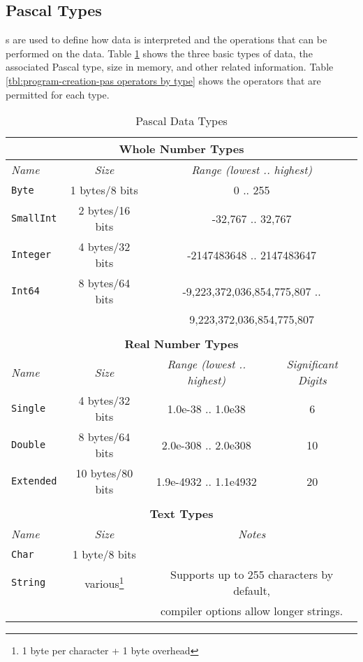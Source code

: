 \clearpage
\subsection{Pascal Types} %
\label{sub:program-creation-pas_types}

s are used to define how data is interpreted and the operations that can be performed on the data. Table \ref{tbl:program-creation-pas-types} shows the three basic types of data, the associated Pascal type, size in memory, and other related information. Table \ref{tbl:program-creation-pas operators by type} shows the operators that are permitted for each type.

\begin{table}[h] 
\begin{minipage}{\textwidth}
\centering
\begin{tabular}{|l|c|c|c|}
\hline
\multicolumn{4}{|c|}{\textbf{Whole Number Types}} \\
\hline
\emph{Name} & \emph{Size} & \multicolumn{2}{c|}{\emph{Range (lowest .. highest)}} \\
\hline
\texttt{Byte} & 1 bytes/8 bits & \multicolumn{2}{c|}{0 .. 255} \\
\texttt{SmallInt} & 2 bytes/16 bits & \multicolumn{2}{c|}{-32,767 .. 32,767} \\
\texttt{Integer} & 4 bytes/32 bits & \multicolumn{2}{c|}{-2147483648 .. 2147483647} \\
\texttt{Int64}    & 8 bytes/64 bits & \multicolumn{2}{c|}{-9,223,372,036,854,775,807 ..} \\
  & & \multicolumn{2}{c|}{9,223,372,036,854,775,807} \\
\hline
\multicolumn{4}{c}{} \\
\hline
\multicolumn{4}{|c|}{\textbf{Real Number Types}} \\
\hline
\emph{Name} & \emph{Size} & \emph{Range (lowest .. highest)} & \emph{Significant Digits} \\
\hline
\texttt{Single} & 4 bytes/32 bits & 1.0e-38 .. 1.0e38 & 6 \\
\texttt{Double} & 8 bytes/64 bits & 2.0e-308 .. 2.0e308 & 10 \\
\texttt{Extended} & 10 bytes/80 bits & 1.9e-4932 .. 1.1e4932 & 20 \\
\hline
\multicolumn{4}{c}{} \\
\hline
\multicolumn{4}{|c|}{\textbf{Text Types}} \\
\hline
\emph{Name} & \emph{Size} & \multicolumn{2}{c|}{\emph{Notes}} \\
\hline
\texttt{Char}  & 1 byte/8 bits & \multicolumn{2}{c|}{} \\
\hline
\texttt{String} & various\footnote{1 byte per character + 1 byte overhead} &  \multicolumn{2}{c|}{Supports up to 255 characters by default,} \\
 & & \multicolumn{2}{c|}{compiler options allow longer strings.} \\
\hline
\end{tabular}
\caption{Pascal Data Types}\label{tbl:program-creation-pas-types}
\end{minipage}
\end{table}

